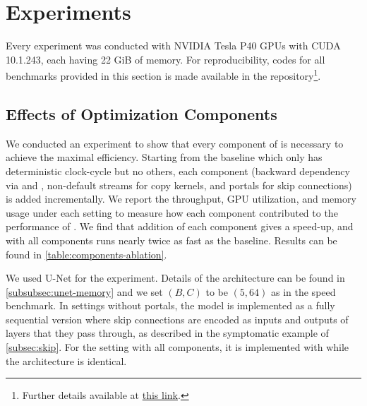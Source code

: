 
\section{Experiments}
\label{sec:experiments}


Every experiment was conducted with NVIDIA Tesla P40 GPUs with CUDA 10.1.243, each having 22 GiB of memory. For reproducibility, codes for all benchmarks provided in this section is made available in the repository\footnote{Further details available at \href{https://torchgpipe.readthedocs.io/en/stable/benchmarks.html}{this link}.}.


\subsection{Effects of Optimization Components}
\label{subsec:ablation-study}

We conducted an experiment to show that every component of {\torchgpipe} is necessary to achieve the maximal efficiency. Starting from the baseline which only has deterministic clock-cycle but no others, each component (backward dependency via  and , non-default streams for copy kernels, and portals for skip connections) is added incrementally. We report the throughput, GPU utilization, and memory usage under each setting to measure how each component contributed to the performance of {\torchgpipe}. We find that addition of each component gives a speed-up, and with all components {\torchgpipe} runs nearly twice as fast as the baseline. Results can be found in \autoref{table:components-ablation}.

We used U-Net for the experiment. Details of the architecture can be found in \autoref{subsubsec:unet-memory} and we set $(B, C)$ to be $(5, 64)$ as in the speed benchmark. In settings without portals, the model is implemented as a fully sequential version where skip connections are encoded as inputs and outputs of layers that they pass through, as described in the symptomatic example of \autoref{subsec:skip}. For the setting with all components, it is implemented with  while the architecture is identical. 

